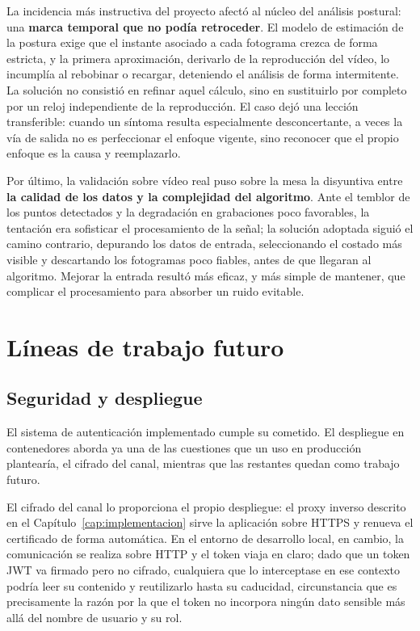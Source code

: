 \documentclass[12pt,a4paper,twoside,openright]{book}
\begin{document}
    La incidencia más instructiva del proyecto afectó al núcleo del análisis
    postural: una \textbf{marca temporal que no podía retroceder}. El modelo de
    estimación de la postura exige que el instante asociado a cada fotograma crezca de
    forma estricta, y la primera aproximación, derivarlo de la reproducción del vídeo,
    lo incumplía al rebobinar o recargar, deteniendo el análisis de
    forma intermitente. La solución no consistió en refinar aquel cálculo, sino
    en sustituirlo por completo por un reloj independiente de la reproducción. El
    caso dejó una lección transferible: cuando un síntoma resulta especialmente
    desconcertante, a veces la vía de salida no es perfeccionar el enfoque
    vigente, sino reconocer que el propio enfoque es la causa y reemplazarlo.

    Por último, la validación sobre vídeo real puso sobre la mesa la disyuntiva
    entre \textbf{la calidad de los datos y la complejidad del algoritmo}. Ante
    el temblor de los puntos detectados y la degradación en grabaciones poco
    favorables, la tentación era sofisticar el procesamiento de la señal; la
    solución adoptada siguió el camino contrario, depurando los datos de entrada,
    seleccionando el costado más visible y descartando los fotogramas poco fiables,
    antes de que llegaran al algoritmo. Mejorar la entrada resultó más
    eficaz, y más simple de mantener, que complicar el procesamiento para
    absorber un ruido evitable.

    \section{Líneas de trabajo futuro}

    \subsection{Seguridad y despliegue}

    El sistema de autenticación implementado cumple su cometido. El despliegue
    en contenedores aborda ya una de las cuestiones que un uso en producción
    plantearía, el cifrado del canal, mientras que las restantes quedan como
    trabajo futuro.

    El cifrado del canal lo proporciona el propio despliegue: el proxy inverso
    descrito en el Capítulo~\ref{cap:implementacion} sirve la aplicación sobre
    HTTPS y renueva el certificado de forma automática. En el entorno de
    desarrollo local, en cambio, la comunicación se realiza sobre HTTP y el
    token viaja en claro; dado que un token JWT va firmado pero no cifrado,
    cualquiera que lo interceptase en ese contexto podría leer su contenido y
    reutilizarlo hasta su caducidad, circunstancia que es precisamente la razón
    por la que el token no incorpora ningún dato sensible más allá del nombre de
    usuario y su rol.
\end{document}
